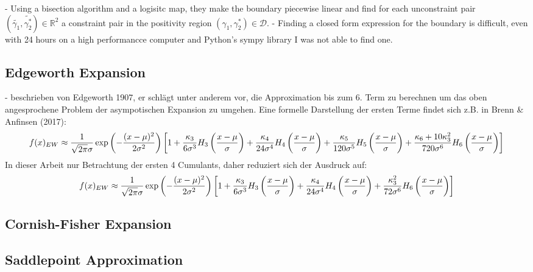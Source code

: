- Using a bisection algorithm and a logisitc map, they make the boundary piecewise linear and find for each unconstraint pair $(\tilde{\gamma_1}, \tilde{\gamma_2^*})\in\mathbb{R}^2$ a constraint pair in the positivity region $(\gamma_1, \gamma_2^*)\in \mathcal{D}$.
- Finding a closed form expression for the boundary is difficult, even with 24 hours on a high performancce computer and Python's sympy library I was not able to find one.


\subsection{Edgeworth Expansion}
- beschrieben von Edgeworth 1907, er schlägt unter anderem vor, die Approximation bis zum 6. Term zu berechnen um das oben angesprochene Problem der asympotischen Expansion zu umgehen. Eine formelle Darstellung der ersten Terme findet sich z.B. in Brenn & Anfinsen (2017):
\begin{align}
    f(x)_{EW} \approx \frac{1}{\sqrt{2\pi}\sigma}\exp\left(-\frac{(x-\mu)^2}{2\sigma^2}\right) \left[1 + \frac{\kappa_3}{6\sigma^3}H_3\left(\frac{x-\mu}{\sigma}\right) + \frac{\kappa_4}{24\sigma^4}H_4\left(\frac{x-\mu}{\sigma}\right) + \frac{\kappa_5}{120\sigma^5}H_5\left(\frac{x-\mu}{\sigma}\right) + \frac{\kappa_6 + 10\kappa_3^2}{720\sigma^6}H_6\left(\frac{x-\mu}{\sigma}\right)\right] \notag
\end{align}
In dieser Arbeit nur Betrachtung der ersten 4 Cumulants, daher reduziert sich der Ausdruck auf:
\begin{align}
    f(x)_{EW} \approx \frac{1}{\sqrt{2\pi}\sigma}\exp\left(-\frac{(x-\mu)^2}{2\sigma^2}\right) \left[1 + \frac{\kappa_3}{6\sigma^3}H_3\left(\frac{x-\mu}{\sigma}\right) + \frac{\kappa_4}{24\sigma^4}H_4\left(\frac{x-\mu}{\sigma}\right) + \frac{\kappa_3^2}{72\sigma^6}H_6\left(\frac{x-\mu}{\sigma}\right)\right] \notag
\end{align}


\subsection{Cornish-Fisher Expansion}

\subsection{Saddlepoint Approximation}